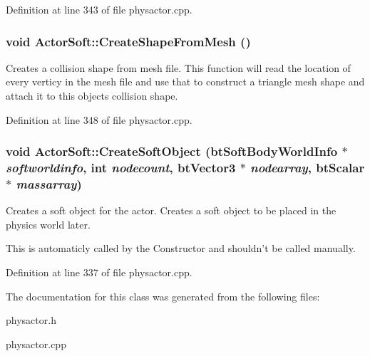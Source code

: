 Definition at line 343 of file physactor.cpp.\hypertarget{classActorSoft_a55ac461f317aed2b812f07eb384b2a6d}{
\subsubsection[{CreateShapeFromMesh}]{\setlength{\rightskip}{0pt plus 5cm}void ActorSoft::CreateShapeFromMesh ()}}
\label{d5/da4/classActorSoft_a55ac461f317aed2b812f07eb384b2a6d}


Creates a collision shape from mesh file. This function will read the location of every verticy in the mesh file and use that to construct a triangle mesh shape and attach it to this objects collision shape. 

Definition at line 348 of file physactor.cpp.\hypertarget{classActorSoft_a01a570c728d6cb96d1a40003d6b17e22}{
\subsubsection[{CreateSoftObject}]{\setlength{\rightskip}{0pt plus 5cm}void ActorSoft::CreateSoftObject (btSoftBodyWorldInfo $\ast$ {\em softworldinfo}, \/  int {\em nodecount}, \/  btVector3 $\ast$ {\em nodearray}, \/  btScalar $\ast$ {\em massarray})}}
\label{d5/da4/classActorSoft_a01a570c728d6cb96d1a40003d6b17e22}


Creates a soft object for the actor. Creates a soft object to be placed in the physics world later. \par
 This is automaticly called by the Constructor and shouldn't be called manually. 

Definition at line 337 of file physactor.cpp.

The documentation for this class was generated from the following files:\begin{DoxyCompactItemize}
\item 
physactor.h\item 
physactor.cpp\end{DoxyCompactItemize}
